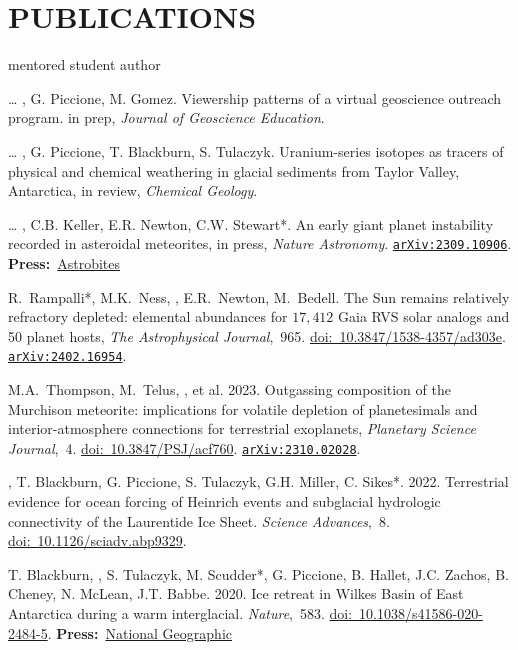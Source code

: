 \section*{PUBLICATIONS}
\hfill* mentored student author
\newcommand{\inprep}[1]{in prep, \textit{#1}}
\newcommand{\submitted}[1]{submitted, \textit{#1}}
\newcommand{\inreview}[1]{in review, \textit{#1}}
\newcommand{\inpress}[1]{in press, \textit{#1}}
\newcommand{\doi}[1]{\href{https://doi.org/#1}{doi:~#1}}
\newcommand{\arxiv}[1]{\href{https://arxiv.org/abs/#1}{\texttt{arXiv:#1}}}
\newcommand{\press}[2]{\textbf{Press:}~\href{#1}{#2}}
\newcommand{\pub}[2]{\textit{#1},~#2}

\begin{etaremune} [itemsep=4pt, leftmargin=3ex]
    \item[\dots] \ghedwards, G. Piccione, M. Gomez. Viewership patterns of a virtual geoscience outreach program. \inprep{Journal of Geoscience Education}.
    \item[\dots] \ghedwards, G. Piccione, T. Blackburn,  S. Tulaczyk. Uranium-series isotopes as tracers of physical and chemical weathering in glacial sediments from Taylor Valley, Antarctica, \inreview{Chemical Geology}.
    \item[\dots] \ghedwards, C.B. Keller, E.R. Newton, C.W. Stewart*. An early giant planet instability recorded in asteroidal meteorites, \inpress{Nature Astronomy}. \arxiv{2309.10906}. \press{https://astrobites.org/2023/09/25/meteorites-planet-migration/}{Astrobites}
    \item R.~Rampalli*, M.K.~Ness, \ghedwards, E.R.~Newton, M.~Bedell. The Sun remains relatively refractory depleted: elemental abundances for $17,412$ Gaia RVS solar analogs and 50 planet hosts, \pub{The Astrophysical Journal}{965}. \doi{10.3847/1538-4357/ad303e}. \arxiv{2402.16954}.
    \item M.A.~Thompson, M.~Telus, \ghedwards, et al. 2023. Outgassing composition of the Murchison meteorite: implications for volatile depletion of planetesimals and interior-atmosphere connections for terrestrial exoplanets, \pub{Planetary Science Journal}{4}. \doi{10.3847/PSJ/acf760}. \arxiv{2310.02028}.
    \item \ghedwards, T. Blackburn, G. Piccione, S. Tulaczyk, G.H. Miller, C. Sikes*. 2022. Terrestrial evidence for ocean forcing of Heinrich events and subglacial hydrologic connectivity of the Laurentide Ice Sheet. \pub{Science Advances}{8}. \doi{10.1126/sciadv.abp9329}.
    \item T. Blackburn, \ghedwards, S. Tulaczyk, M. Scudder*, G. Piccione, B. Hallet, J.C. Zachos, B. Cheney, N. McLean, J.T. Babbe. 2020. Ice retreat in Wilkes Basin of East Antarctica during a warm interglacial. \pub{Nature}{583}. \doi{10.1038/s41586-020-2484-5}. \press{https://www.nationalgeographic.com/science/2020/07/east-antarctic-ice-sheet-more-vulnerable-to-melting-than-thought/}{National Geographic}

\end{etaremune}
